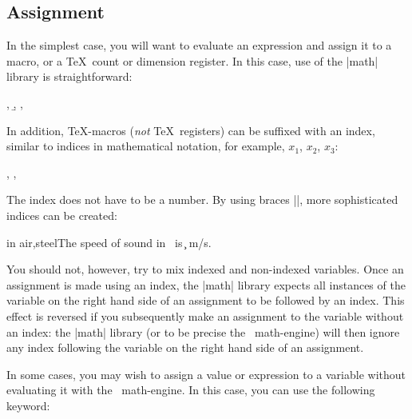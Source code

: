 \subsection{Assignment}
	
	In the simplest case, you will want to evaluate an expression
	and assign it to a macro, or a \TeX\ count or dimension register.
	In this case, use of the |math| library is straightforward:

\begin{codeexample}[]
\newcount\mycount
\newdimen\mydimen
{}
\a, \b, \the\mycount, \the\mydimen
\end{codeexample}


	In addition, \TeX-macros (\emph{not} \TeX\ registers)
	can be suffixed with an index, similar to
	indices in mathematical notation, for example, $x_1$, $x_2$, $x_3$:
	
\begin{codeexample}[]
, , 
\end{codeexample}

	The index does not have to be a number. By using braces |{}|,
	more sophisticated indices can be created:
	
\begin{codeexample}[]
\foreach \medium in {air,steel}{The speed of sound in \medium\ is \c{\medium} m/s. }
\end{codeexample}

	You should not, however, try to mix indexed and non-indexed variables. Once
	an assignment is made using an index, the |math| library expects
	all instances of the variable on the right hand side of an assignment 
	to be followed by an index. This effect is reversed if you
	subsequently make an assignment to the variable without an index: the |math| library
	(or to be precise the \pgfname\ math-engine)
	will then ignore any index following the variable on the right hand side
	of an assignment.

	In some cases, you may wish to assign a value or expression to a variable
	without evaluating it with the \pgfname\ math-engine. In this case, you
	can use the following keyword:

	
